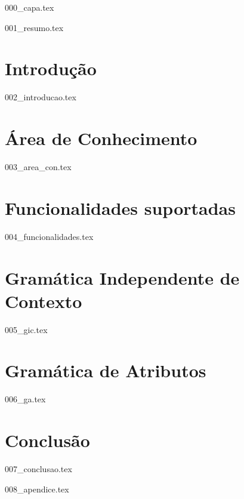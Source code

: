 \documentclass{article}
\begin{document}
{000_capa.tex}

{001_resumo.tex}

\tableofcontents

\section{Introdução}
{002_introducao.tex}\label{intro}

\section{Área de Conhecimento}
{003_area_con.tex}\label{sec:areaCon}

\section{Funcionalidades suportadas}
{004_funcionalidades.tex}\label{sec:funcs}

\section{Gramática Independente de Contexto}\label{sec:gic}
{005_gic.tex}


\section{Gramática de Atributos}\label{sec:ga}
{006_ga.tex}


\section{Conclusão} \label{sec:conc}
{007_conclusao.tex}

\printbibliography

\appendix
{008_apendice.tex}
\end{document}
